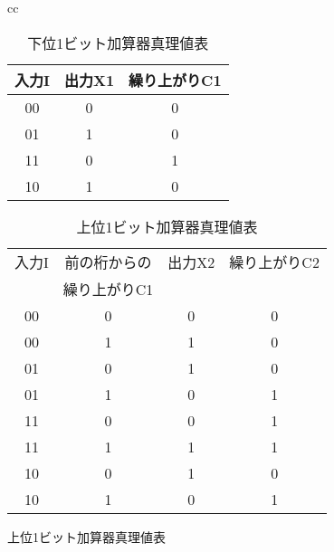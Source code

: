 \documentclass[dvipdfmx,titlepage, 11pt, a4paper]{jsarticle}%
\begin{document}
\begin{enumerate}[(1)]
    \begin{figure}[H]
        \centering
        \begin{tabular}{cc}
            \begin{minipage}{0.4\linewidth}
                \centering
                \begin{table}[H]
                    \caption{下位1ビット加算器真理値表}
                    \centering
                    \begin{tabular}{ccc}
                        \hline
                        入力I & 出力X1 & 繰り上がりC1\\
                        \hline
                        00 & 0 & 0\\
                        01 & 1 & 0\\
                        11 & 0 & 1\\
                        10 & 1 & 0\\
                        \hline
                    \end{tabular}
                \end{table}
            \end{minipage}
            \begin{minipage}{0.5\linewidth}
                \centering
                \begin{table}[H]
                    \caption{上位1ビット加算器真理値表}
                    \centering
                    \begin{tabular}{cccc}
                        \hline
                        入力I & 前の桁からの& 出力X2 & 繰り上がりC2\\
                         & 繰り上がりC1&  & \\
                        \hline
                        00 & 0 & 0 & 0\\
                        00 & 1 & 1 & 0\\
                        01 & 0 & 1 & 0\\
                        01 & 1 & 0 & 1\\
                        11 & 0 & 0 & 1\\
                        11 & 1 & 1 & 1\\
                        10 & 0 & 1 & 0\\
                        10 & 1 & 0 & 1\\
                        \hline
                    \end{tabular}
                \end{table}

\end{minipage}
\end{tabular}
\end{figure}
\end{enumerate}
\end{document}
